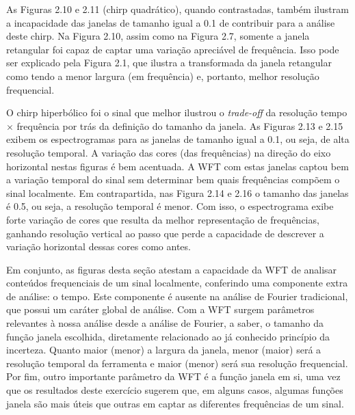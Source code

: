 As Figuras 2.10 e 2.11 (chirp quadrático), quando contrastadas, também ilustram a incapacidade das janelas de tamanho igual a 0.1 de contribuir para a análise deste chirp. Na Figura 2.10, assim como na Figura 2.7, somente a janela retangular foi capaz de captar uma variação apreciável de frequência. Isso pode ser explicado pela Figura 2.1, que ilustra a transformada da janela retangular como tendo a menor largura (em frequência) e, portanto, melhor resolução frequencial. %

O chirp hiperbólico foi o sinal que melhor ilustrou o \textit{trade-off} da resolução tempo $\times$ frequência por trás da definição do tamanho da janela. As Figuras 2.13 e 2.15 exibem os espectrogramas para as janelas de tamanho igual a 0.1, ou seja, de alta resolução temporal. A variação das cores (das frequências) na direção do eixo horizontal nestas figuras é bem acentuada. A WFT com estas janelas captou bem a variação temporal do sinal sem determinar bem quais frequências compõem o sinal localmente. Em contrapartida, nas Figura 2.14 e 2.16 o tamanho das janelas é 0.5, ou seja, a resolução temporal é menor. Com isso, o espectrograma exibe forte variação de cores que resulta da melhor representação de frequências, ganhando resolução vertical ao passo que perde a capacidade de descrever a variação horizontal dessas cores como antes. 

Em conjunto, as figuras desta seção atestam a capacidade da WFT de analisar conteúdos frequenciais de um sinal localmente, conferindo uma componente extra de análise: o tempo. Este componente é ausente na análise de Fourier tradicional, que possui um caráter global de análise. Com a WFT surgem parâmetros relevantes à nossa análise desde a análise de Fourier, a saber, o tamanho da função janela escolhida, diretamente relacionado ao já conhecido princípio da incerteza. Quanto maior (menor) a largura da janela, menor (maior) será a resolução temporal da ferramenta e maior (menor) será sua resolução frequencial. Por fim, outro importante parâmetro da WFT é a função janela em si, uma vez que os resultados deste exercício sugerem que, em alguns casos, algumas funções janela são mais úteis que outras em captar as diferentes frequências de um sinal.
















